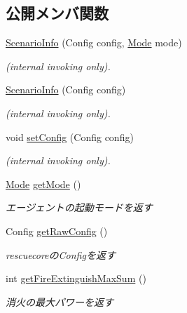 \subsection*{公開メンバ関数}
\begin{DoxyCompactItemize}
\item 
\hyperlink{classadf_1_1agent_1_1info_1_1ScenarioInfo_a3fecc58b0e8396a6935653e872cdb8b6}{Scenario\+Info} (Config config, \hyperlink{enumadf_1_1agent_1_1info_1_1ScenarioInfo_1_1Mode}{Mode} mode)
\begin{DoxyCompactList}\small\item\em (internal invoking only). \end{DoxyCompactList}\item 
\hyperlink{classadf_1_1agent_1_1info_1_1ScenarioInfo_a6150d210d4172e378c6d427ae48ce6ab}{Scenario\+Info} (Config config)
\begin{DoxyCompactList}\small\item\em (internal invoking only). \end{DoxyCompactList}\item 
void \hyperlink{classadf_1_1agent_1_1info_1_1ScenarioInfo_afc3003e18c38d96a6466b09afd95ca82}{set\+Config} (Config config)
\begin{DoxyCompactList}\small\item\em (internal invoking only). \end{DoxyCompactList}\item 
\hyperlink{enumadf_1_1agent_1_1info_1_1ScenarioInfo_1_1Mode}{Mode} \hyperlink{classadf_1_1agent_1_1info_1_1ScenarioInfo_a000d044bd9136cd5fea0f09ce3d80d4c}{get\+Mode} ()
\begin{DoxyCompactList}\small\item\em エージェントの起動モードを返す \end{DoxyCompactList}\item 
Config \hyperlink{classadf_1_1agent_1_1info_1_1ScenarioInfo_ad3f65f6d6fbcc5bc162f96bd034e78de}{get\+Raw\+Config} ()
\begin{DoxyCompactList}\small\item\em rescuecoreの\+Configを返す \end{DoxyCompactList}\item 
int \hyperlink{classadf_1_1agent_1_1info_1_1ScenarioInfo_a29923a4d0d7f146ed299591638c8a14d}{get\+Fire\+Extinguish\+Max\+Sum} ()
\begin{DoxyCompactList}\small\item\em 消火の最大パワーを返す \end{DoxyCompactList}\item 

\end{DoxyCompactItemize}
